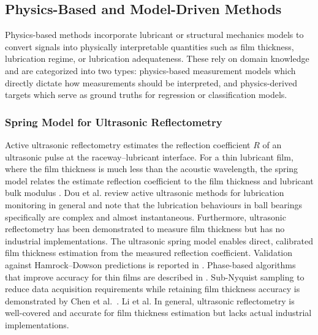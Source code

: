 \subsection{Physics-Based and Model-Driven Methods}
\label{subsec:sp_model}

Physics-based methods incorporate lubricant or structural mechanics models to convert signals into physically interpretable quantities such as film thickness, lubrication regime, or lubrication adequateness. These rely on domain knowledge and are categorized into two types: physics-based measurement models which directly dictate how measurements should be interpreted, and physics-derived targets which serve as ground truths for regression or classification models.

\subsubsection{Spring Model for Ultrasonic Reflectometry}
\label{subsubsec:spring}
Active ultrasonic reflectometry estimates the reflection coefficient $R$ of an ultrasonic pulse at the raceway--lubricant interface. For a thin lubricant film, where the film thickness is much less than the acoustic wavelength, the spring model relates the estimate reflection coefficient to the film thickness and lubricant bulk modulus \cite{drinkwater_ultrasonic_2009}. Dou et al. \cite{dou_review_2022} review active ultrasonic methods for lubrication monitoring in general and note that the lubrication behaviours in ball bearings specifically are complex and almost instantaneous. Furthermore, ultrasonic reflectometry has been demonstrated to measure film thickness but has no industrial implementations. The ultrasonic spring model enables direct, calibrated film thickness estimation from the measured reflection coefficient. Validation against Hamrock--Dowson predictions is reported in \cite{dwyer-joyce_measurement_2003,zhang_ultrasonic_2015,chen_evaluation_2023}. Phase-based algorithms that improve accuracy for thin films are described in \cite{wang_accuracy-improved_2024}. Sub-Nyquist sampling to reduce data acquisition requirements while retaining film thickness accuracy is demonstrated by Chen et al.\ \cite{chen_sub-nyquist_2025}. Li et al. In general, ultrasonic reflectometry is well-covered and accurate for film thickness estimation but lacks actual industrial implementations.

